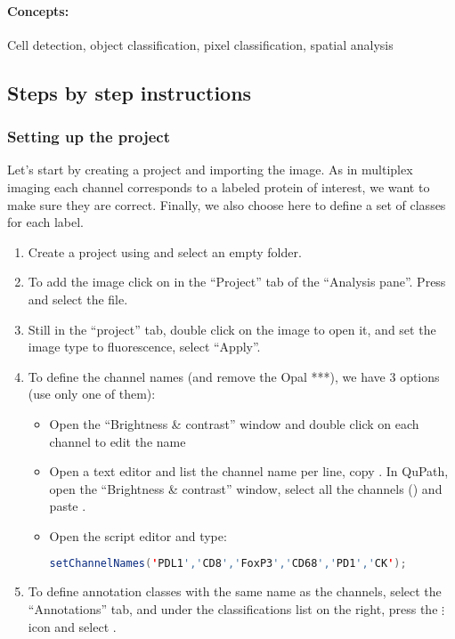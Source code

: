 \documentclass[a4paper,DIV=17,dvipsnames,headsepline]{scrartcl}
\begin{document}
\paragraph{Concepts:} Cell detection, object classification, pixel classification, spatial analysis

\subsection{Steps by step instructions}
\subsubsection{Setting up the project}
 Let's start by creating a project and importing the image. As in multiplex imaging each channel corresponds to a labeled protein of interest, we want to make sure they are correct. Finally, we also choose here to define a set of classes for each label.

\begin{enumerate}
\item Create a project using  and select an empty folder.
\item To add the image click on  in the ``Project'' tab of the ``Analysis pane''. Press  and select the file.
\item Still in the ``project'' tab, double click on the image to open it, and set the image type to fluorescence, select ``Apply''.
\item To define the channel names (and remove the Opal ***), we have 3 options (use only one of them):
\begin{itemize}
    \item Open the ``Brightness \& contrast'' window and double click on each channel to edit the name
    \item Open a text editor and list the channel name per line, copy .  In QuPath, open the ``Brightness \& contrast'' window, select all the channels () and paste .
    \item Open the script editor \keys{\ctrl+[} and type:
    \begin{lstlisting}[language=java]
setChannelNames('PDL1','CD8','FoxP3','CD68','PD1','CK');
    \end{lstlisting}
\end{itemize}
\item To define annotation classes with the same name as the channels, select the ``Annotations'' tab, and under the classifications list on the right,  press the $\vdots$ icon and select .
\end{enumerate}
\end{document}
